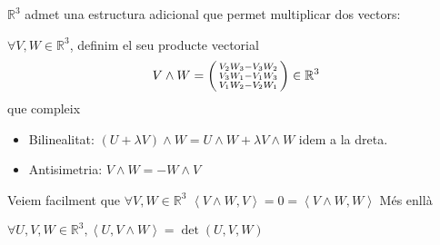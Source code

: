 \documentclass[../main.tex]{subfiles}
\begin{document}
$\mathbb{R}^3$ admet una estructura adicional que permet multiplicar dos vectors:
\begin{definicio}
    $\forall V, W \in \mathbb{R}^3$, definim el seu producte vectorial
    \begin{displaymath}
        V\wedge W = \begin{psmallmatrix}
        V_2W_3-V_3W_2\\
        V_3W_1-V_1W_3\\
        V_1W_2-V_2W_1
        \end{psmallmatrix} \in \mathbb{R}^3
    \end{displaymath}
    que compleix
    \begin{itemize}
        \item Bilinealitat: $(U + \lambda V) \wedge W = U\wedge W + \lambda V\wedge W$ idem a la
        dreta.
        \item Antisimetria: $V\wedge W = -W \wedge V$
    \end{itemize}
\end{definicio}
Veiem facilment que $\forall V, W \in \mathbb{R}^3$ $\left\langle V\wedge W, V\right\rangle = 0 = \left\langle V\wedge W, W\right\rangle$
Més enllà
\begin{proposition}
    $\forall U, V, W \in \mathbb{R}^3, \left\langle U, V\wedge W\right\rangle = \det{\left(U, V, W\right)}$
\end{proposition}
\end{document}
